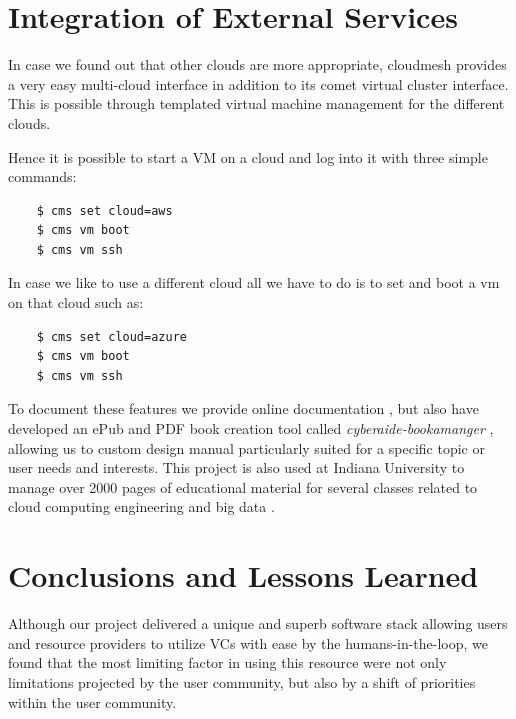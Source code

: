 \documentclass[sigconf,hyphens]{acmart}
\begin{document}
\section{Integration of External Services}\label{sec:external}

In case we found out that other clouds are more appropriate, cloudmesh provides a very easy multi-cloud interface in addition to its comet virtual cluster interface. This is possible through templated virtual machine management for the different clouds.

Hence it is possible to start a VM on a cloud and log into it with three simple commands:

\begin{verbatim}
    $ cms set cloud=aws 
    $ cms vm boot
    $ cms vm ssh
\end{verbatim}

In case we like to use a different cloud all we have to do is to set and boot a vm on that cloud such as:

\begin{verbatim}
    $ cms set cloud=azure 
    $ cms vm boot
    $ cms vm ssh
\end{verbatim}

To document these features we provide online documentation
\cite{www-cloudmesh-manual,las-cloudmesh}, but also have developed an
ePub and PDF book creation tool called {\em cyberaide-bookamanger}
\cite{las-bookmanager}, allowing us to custom design manual
particularly suited for a specific topic or user needs and interests.
This project is also used at Indiana University to manage over 2000
pages of educational material for several classes related to cloud
computing engineering \cite{las-cloud,las-python} and big data
\cite{las-bigdata-class}.

\section{Conclusions and Lessons Learned}\label{sec:conclusion}

Although our project delivered a unique and superb software stack
allowing users and resource providers to utilize VCs with ease by the
humans-in-the-loop, we found that the most limiting factor in using
this resource were not only limitations projected by the user
community, but also by a shift of priorities within the user
community.
\end{document}
